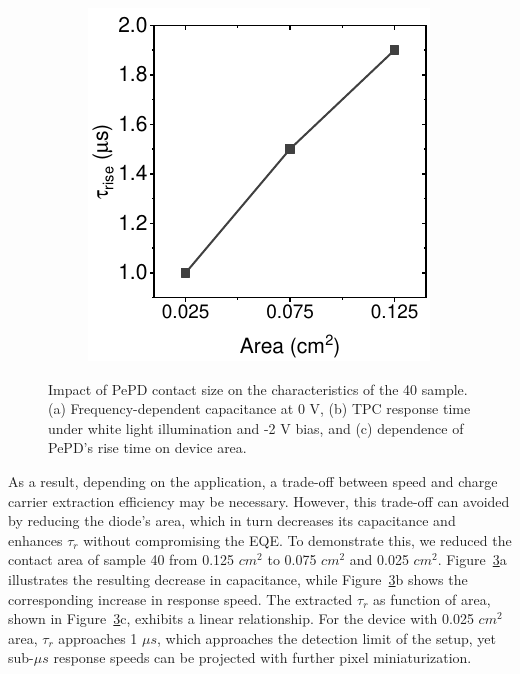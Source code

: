 \begin{figure}[htbp]
\begin{subfigure}{0.3\textwidth}
        \caption{}
        \label{}
    \end{subfigure}
    \hfill
    \begin{subfigure}{0.29\textwidth}
        \centering
        \includegraphics[width=\textwidth]{chapters/transport_layers/images/Rise_time_farea.pdf}
        \caption{}
        \label{}
    \end{subfigure}
    
    \caption{Impact of PePD contact size on the characteristics of the 40 sample. (a) Frequency-dependent capacitance at 0 V, (b) TPC response time under white light illumination and -2 V bias, and (c) dependence of PePD's rise time on device area.}
    \label{fig:etl_opt:dev_area}
\end{figure}

As a result, depending on the application, a trade-off between speed and charge carrier extraction efficiency may be necessary. However, this trade-off can avoided by reducing the diode's area, which in turn decreases its capacitance and enhances $\tau_r$ without compromising the EQE. To demonstrate this, we reduced the contact area of sample 40 from 0.125 $cm^2$ to 0.075 $cm^2$ and 0.025 $cm^2$. Figure~\ref{fig:etl_opt:dev_area}a illustrates the resulting decrease in capacitance, while Figure~\ref{fig:etl_opt:dev_area}b shows the corresponding increase in response speed. The extracted $\tau_r$ as function of area, shown in Figure~\ref{fig:etl_opt:dev_area}c, exhibits a linear relationship. For the device with 0.025 $cm^2$ area, $\tau_r$ approaches 1 $\mu s$, which approaches the detection limit of the setup, yet sub-$\mu s$ response speeds can be projected with further pixel miniaturization.

